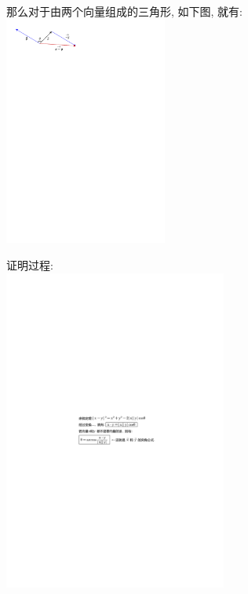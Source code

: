 \documentclass[UTF8]{ctexart}
\begin{document}
那么对于由两个向量组成的三角形, 如下图, 就有: \\
\includegraphics[width=0.4\textwidth]{img/0096.pdf}



证明过程: \\
\includegraphics[width=0.55\textwidth]{img/0100.pdf}\\
\end{document}
